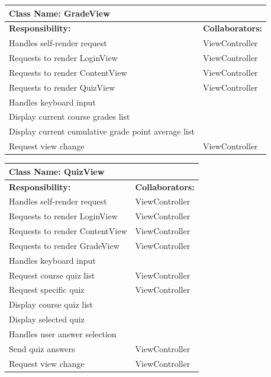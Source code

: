 \documentclass[]{article}
\begin{document}
\begin{enumerate}[a)]
  \begin{table}[H]
    \centering
    \begin{tabular}{|p{9cm}|p{3cm}|}
    \hline
     \multicolumn{2}{|l|}{\textbf{Class Name:} GradeView} \\
    \hline
    \textbf{Responsibility:} & \textbf{Collaborators:} \\
    \hline
    Handles self-render request & ViewController \\
    \hline
    Requests to render LoginView & ViewController \\
    \hline
    Requests to render ContentView & ViewController \\
    \hline
    Requests to render QuizView & ViewController \\
    \hline
    Handles keyboard input & \\
    \hline
    Display current course grades list & \\
    \hline
    Display current cumulative grade point average list & \\
    \hline
    Request view change & ViewController \\
    \hline
    \end{tabular}
  \end{table}

  \begin{table}[H]
    \centering
    \begin{tabular}{|p{9cm}|p{3cm}|}
    \hline
     \multicolumn{2}{|l|}{\textbf{Class Name:} QuizView} \\
    \hline
    \textbf{Responsibility:} & \textbf{Collaborators:} \\
    \hline
    Handles self-render request & ViewController \\
    \hline
    Requests to render LoginView & ViewController \\
    \hline
    Requests to render ContentView & ViewController \\
    \hline
    Requests to render GradeView & ViewController \\
    \hline
    Handles keyboard input & \\
    \hline
    Request course quiz list & ViewController \\
    \hline
    Request specific quiz & ViewController \\
    \hline
    Display course quiz list & \\
    \hline
    Display selected quiz & \\
    \hline
    Handles user answer selection & \\
    \hline
    Send quiz answers & ViewController \\
    \hline
    Request view change & ViewController \\
    \hline
    \end{tabular}
  \end{table}


\end{enumerate}
\end{document}
